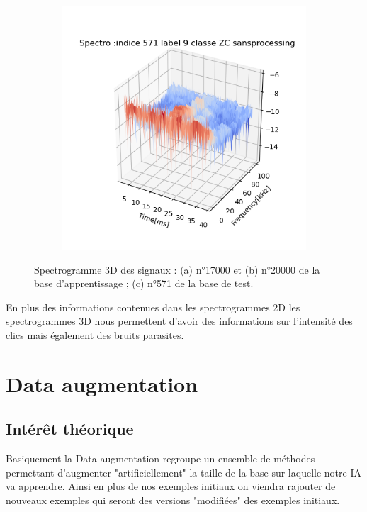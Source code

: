 \begin{figure}[!h]
\begin{subfigure}[b]{0.3\textwidth}
  \end{subfigure}
  \begin{subfigure}[b]{0.3\textwidth}
    \includegraphics[width=\textwidth]{./images/indice571Spectro3Dlabel9classeZCsansprocessingsanszoom.png}
  \end{subfigure}
  \caption{Spectrogramme 3D des signaux : (a) n°17000 et (b) n°20000 de la base d'apprentissage ; (c) n°571 de la base de test.%
  \label{fig:spectros3D}}
\end{figure}

En plus des informations contenues dans les spectrogrammes 2D les spectrogrammes 3D nous permettent d'avoir des informations sur l'intensité des clics mais également des bruits parasites.

\hypertarget{Data-augmentation}{%
\section{Data augmentation}
\label{Data-augmentation}}

\hypertarget{}{%
\subsection{Intérêt théorique}
\label{interets_theoriques}}

Basiquement la Data augmentation regroupe un ensemble de méthodes permettant d'augmenter "artificiellement" la taille de la base sur laquelle notre IA va apprendre. Ainsi en plus de nos exemples initiaux on viendra rajouter de nouveaux exemples qui seront des versions "modifiées" des exemples initiaux.

